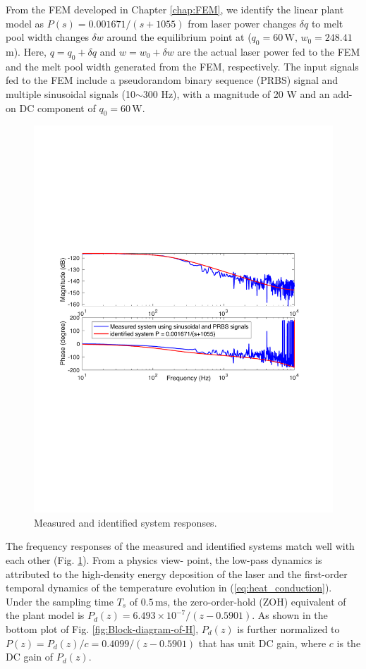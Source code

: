 \documentclass [11pt, proquest] {uwthesis}[2020/02/24]
\begin{document}
From the FEM developed in Chapter \ref{chap:FEM}, we identify the linear plant model as $P(s)=0.001671/(s+1055)$
from laser power changes $\delta q$ to melt pool width changes $\delta w$
around the equilibrium point at ($q_{0}=60\,\text{W},\,$$w_{0}=248.41\,$\textmu m).
Here, $q=q_{0}+\delta q$ and $w=w_{0}+\delta w$ are the actual laser
power fed to the FEM and the melt pool width generated from the FEM,
respectively. The input signals fed to the FEM include a pseudorandom
binary sequence (PRBS) signal and multiple sinusoidal signals (10$\sim$300
Hz), with a magnitude of 20 W and an add-on DC component of $q_{0}=60\,\text{W}$.
\begin{figure}[!ht]
\begin{centering}
\includegraphics[clip,width=13cm]{Hammerstein/systemid_measured_identified_systems}
\par\end{centering}
\centering{}\caption{\label{fig:Measured-and-identified-H}Measured and identified system
responses.}
\end{figure}
The frequency responses of the measured and identified systems match
well with each other (Fig. \ref{fig:Measured-and-identified-H}). From a physics view- point, the low-pass dynamics is attributed to the high-density energy deposition of the laser and the first-order temporal dynamics of the temperature evolution in (\ref{eq:heat_conduction}). Under
the sampling time $T_{s}$ of $0.5\,\text{ms}$, the zero-order-hold (ZOH)
equivalent of the plant model is $P_{d}(z)=6.493\times10^{-7}/(z-0.5901)$.
As shown in the bottom plot of Fig. \ref{fig:Block-diagram-of-H}, $P_{d}(z)$
is further normalized to $P(z)=P_{d}(z)/c=0.4099/(z-0.5901)$ that
has unit DC gain, where $c$ is the DC gain of $P_{d}(z)$.
\end{document}
